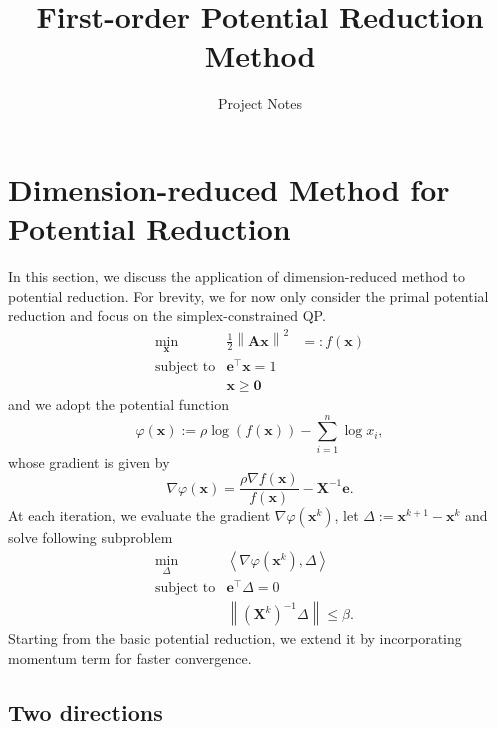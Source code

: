 \documentclass{article}
\newcommand{\assign}{:=}
\newcommand{\backassign}{=:}
\newcommand{\x}{\mathbf{x}}
\newcommand{\A}{\mathbf{A}}
\newcommand{\0}{\textbf{0}}
\newcommand{\e}{\mathbf{e}}
\newcommand{\n}{\nabla}
\newcommand{\X}{\mathbf{X}}
\begin{document}
\title{First-order Potential Reduction Method \vspace{10pt}}

\author{
Project Notes \vspace{10pt}
}

\maketitle

\section{Dimension-reduced Method for Potential Reduction}

In this section, we discuss the application of dimension-reduced method to
potential reduction. For brevity, we for now only consider the primal
potential reduction and focus on the simplex-constrained QP.
\begin{eqnarray*}
  \min_{\x} & \frac{1}{2} \left\| \A \x \right\|^2 & \backassign f \left( \x
  \right)\\
  \text{subject to} & \e^{\top} \x = 1 & \\
  & \x \geq \0 & 
\end{eqnarray*}
and we adopt the potential function
\[ \varphi \left( \x \right) \assign \rho \log \left( f \left( \x \right)
   \right) - \sum_{i = 1}^n \log x_i, \]
whose gradient is given by
\[ \n \varphi \left( \x \right) = \frac{\rho \n f \left( \x \right)}{f \left(
   \x \right)} - \X^{- 1} \e . \]
At each iteration, we evaluate the gradient $\n \varphi \left( \x^k \right)$,
let $\Delta \assign \x^{k + 1} - \x^k$ and solve following subproblem
\begin{eqnarray*}
  \min_{\Delta} & \left\langle \n \varphi \left( \x^k \right), \Delta
  \right\rangle & \\
  \text{subject to} & \e^{\top} \Delta = 0 & \\
  & \left\| \left( \X^k \right)^{- 1} \Delta \right\| \leq \beta . & 
\end{eqnarray*}
Starting from the basic potential reduction, we extend it by incorporating
momentum term for faster convergence.

\subsection{Two directions}
\end{document}
